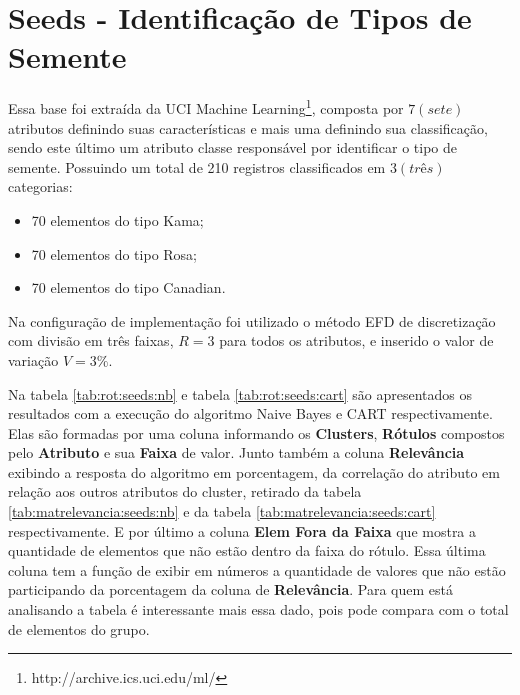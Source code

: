 \section{Seeds - Identificação de Tipos de Semente}
Essa base foi extraída da UCI Machine Learning\footnote{http://archive.ics.uci.edu/ml/}, composta por ${7(sete)}$ atributos definindo suas características e mais uma definindo sua classificação, sendo este último um atributo classe  responsável por identificar o tipo de semente. Possuindo um total de 210 registros classificados em ${3(três)}$ categorias:
\begin{itemize}[noitemsep]
 \item 70 elementos do tipo Kama;
 \item 70 elementos do tipo Rosa;
 \item 70 elementos do tipo Canadian.
\end{itemize}
Na configuração de implementação foi utilizado o método EFD de discretização com divisão em três faixas, ${R=3}$ para todos os atributos, e inserido o valor de variação ${V=3\%}$.

Na tabela \ref{tab:rot:seeds:nb} e tabela \ref{tab:rot:seeds:cart} são  apresentados os resultados com a execução do algoritmo Naive Bayes e CART respectivamente. Elas são formadas por uma coluna informando os \textbf{Clusters}, \textbf{Rótulos}  compostos pelo \textbf{Atributo} e sua \textbf{Faixa} de valor. Junto também a coluna \textbf{Relevância} exibindo a resposta do algoritmo em porcentagem, da correlação do atributo em relação aos outros atributos do cluster, retirado da tabela \ref{tab:matrelevancia:seeds:nb} e da tabela \ref{tab:matrelevancia:seeds:cart} respectivamente. E por último a coluna \textbf{Elem Fora da Faixa} que mostra a quantidade de elementos que não estão dentro da faixa do rótulo. Essa última coluna tem a função de exibir em números a quantidade de valores que não estão participando da porcentagem da coluna de \textbf{Relevância}. Para quem está analisando a tabela é interessante mais essa dado, pois pode compara com o total de elementos do grupo.

